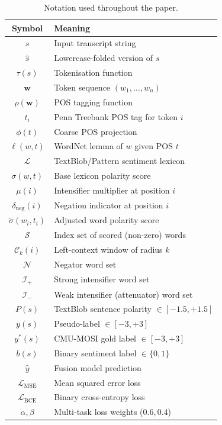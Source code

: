 \documentclass[12pt,a4paper]{article}
\theoremstyle{plain}
\theoremstyle{definition}
\begin{document}
\begin{table}[H]
\centering
\caption{Notation used throughout the paper.}
\label{tab:notation}
\begin{tabular}{cl}
\toprule
Symbol & Meaning \\
\midrule
$s$                      & Input transcript string \\
$\hat{s}$                & Lowercase-folded version of $s$ \\
$\tau(s)$                & Tokenisation function \\
$\mathbf{w}$             & Token sequence $(w_1,\ldots,w_n)$ \\
$\rho(\mathbf{w})$       & POS tagging function \\
$t_i$                    & Penn Treebank POS tag for token $i$ \\
$\phi(t)$                & Coarse POS projection \\
$\ell(w,t)$              & WordNet lemma of $w$ given POS $t$ \\
$\mathcal{L}$            & TextBlob/Pattern sentiment lexicon \\
$\sigma(w,t)$            & Base lexicon polarity score \\
$\mu(i)$                 & Intensifier multiplier at position $i$ \\
$\delta_\text{neg}(i)$   & Negation indicator at position $i$ \\
$\tilde{\sigma}(w_i,t_i)$& Adjusted word polarity score \\
$\mathcal{S}$            & Index set of scored (non-zero) words \\
$\mathcal{C}_k(i)$       & Left-context window of radius $k$ \\
$\mathcal{N}$            & Negator word set \\
$\mathcal{I}_+$          & Strong intensifier word set \\
$\mathcal{I}_-$          & Weak intensifier (attenuator) word set \\
$P(s)$                   & TextBlob sentence polarity $\in[-1.5,+1.5]$ \\
$y(s)$                   & Pseudo-label $\in[-3,+3]$ \\
$y^*(s)$                 & CMU-MOSI gold label $\in[-3,+3]$ \\
$b(s)$                   & Binary sentiment label $\in\{0,1\}$ \\
$\hat{y}$                & Fusion model prediction \\
$\mathcal{L}_\text{MSE}$ & Mean squared error loss \\
$\mathcal{L}_\text{BCE}$ & Binary cross-entropy loss \\
$\alpha, \beta$          & Multi-task loss weights ($0.6, 0.4$) \\
\bottomrule
\end{tabular}
\end{table}
\end{document}
